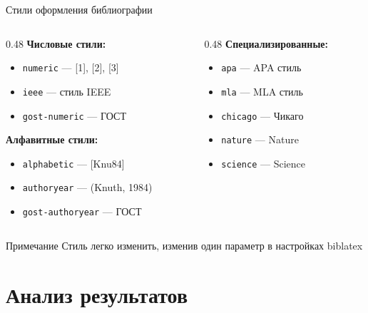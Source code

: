 \documentclass[aspectratio=169, 12pt]{beamer}
\begin{document}
\begin{frame}{Стили оформления библиографии}
  \begin{columns}[T]
    \begin{column}{0.48\textwidth}
      \textbf{Числовые стили:}
      \begin{itemize}
        \item \texttt{numeric} — [1], [2], [3]
        \item \texttt{ieee} — стиль IEEE
        \item \texttt{gost-numeric} — ГОСТ
      \end{itemize}
      
      \vspace{0.5cm}
      
      \textbf{Алфавитные стили:}
      \begin{itemize}
        \item \texttt{alphabetic} — [Knu84]
        \item \texttt{authoryear} — (Knuth, 1984)
        \item \texttt{gost-authoryear} — ГОСТ
      \end{itemize}
    \end{column}
    
    \begin{column}{0.48\textwidth}
      \textbf{Специализированные:}
      \begin{itemize}
        \item \texttt{apa} — APA стиль
        \item \texttt{mla} — MLA стиль
        \item \texttt{chicago} — Чикаго
        \item \texttt{nature} — Nature
        \item \texttt{science} — Science
      \end{itemize}
    \end{column}
  \end{columns}
  
  \vspace{0.5cm}
  
  \begin{alertblock}{Примечание}
    Стиль легко изменить, изменив один параметр в настройках biblatex
  \end{alertblock}
\end{frame}

\section{Анализ результатов}
\end{document}
